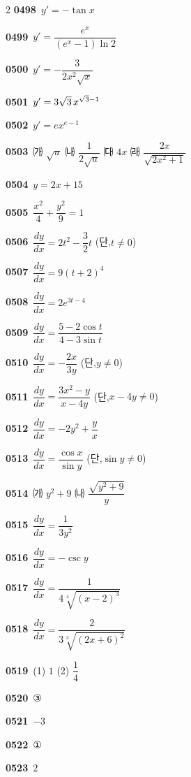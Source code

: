 \documentclass[10pt,a4paper]{article}
\newcommand{\cond}[1]{\mbox{(단,}\nobreakspace#1)}
\begin{document}
\begin{multicols}{2}
\noindent\textbf{0498}\ $y'=-\tan x$\par
\noindent\textbf{0499}\ $y'=\dfrac{e^x}{(e^x-1)\ln 2}$\par
\noindent\textbf{0500}\ $y'=-\dfrac{3}{2x^2\sqrt{x}}$\par
\noindent\textbf{0501}\ $y'=3\sqrt{3}\mkern3mu x^{\sqrt{3}-1}$\par
\noindent\textbf{0502}\ $y'=ex^{e-1}$\par
\noindent\textbf{0503}\ ㈎ $\sqrt{u}$ \quad ㈏ $\dfrac{1}{2\sqrt{u}}$ \quad ㈐ $4x$ \quad ㈑ $\dfrac{2x}{\sqrt{2x^2+1}}$\par
\noindent\textbf{0504}\ $y=2x+15$\par
\noindent\textbf{0505}\ $\dfrac{x^2}{4}+\dfrac{y^2}{9}=1$\par
\noindent\textbf{0506}\ $\dfrac{dy}{dx}=2t^2-\dfrac{3}{2}t$ \cond{$t\ne 0$}\par
\noindent\textbf{0507}\ $\dfrac{dy}{dx}=9(t+2)^4$\par
\noindent\textbf{0508}\ $\dfrac{dy}{dx}=2e^{3t-4}$\par
\noindent\textbf{0509}\ $\dfrac{dy}{dx}=\dfrac{5-2\cos t}{4-3\sin t}$\par
\noindent\textbf{0510}\ $\dfrac{dy}{dx}=-\dfrac{2x}{3y}$ \cond{$y\ne 0$}\par
\noindent\textbf{0511}\ $\dfrac{dy}{dx}=\dfrac{3x^2-y}{x-4y}$ \cond{$x-4y\ne 0$}\par
\noindent\textbf{0512}\ $\dfrac{dy}{dx}=-2y^2+\dfrac{y}{x}$\par
\noindent\textbf{0513}\ $\dfrac{dy}{dx}=\dfrac{\cos x}{\sin y}$ \cond{$\sin y\ne 0$}\par
\noindent\textbf{0514}\ ㈎ $y^2+9$ \quad ㈏ $\dfrac{\sqrt{y^2+9}}{y}$\par
\noindent\textbf{0515}\ $\dfrac{dy}{dx}=\dfrac{1}{3y^2}$\par
\noindent\textbf{0516}\ $\dfrac{dy}{dx}=-\csc y$\par
\noindent\textbf{0517}\ $\dfrac{dy}{dx}=\dfrac{1}{4\sqrt[4]{(x-2)^3}}$\par
\noindent\textbf{0518}\ $\dfrac{dy}{dx}=\dfrac{2}{3\sqrt[3]{(2x+6)^2}}$\par
\noindent\textbf{0519}\ (1) $1$ \quad (2) $\dfrac{1}{4}$\par
\noindent\textbf{0520}\ ③\par
\noindent\textbf{0521}\ $-3$\par
\noindent\textbf{0522}\ ①\par
\noindent\textbf{0523}\ $2$\par

\end{multicols}
\end{document}
